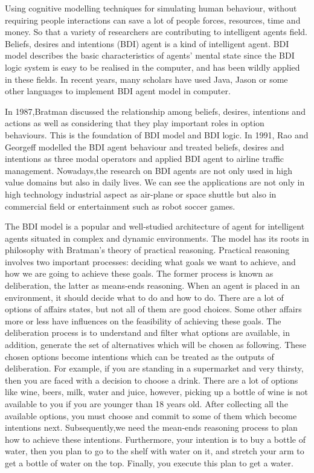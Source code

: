 Using cognitive modelling techniques for simulating human behaviour, without requiring people interactions can save a lot of people forces, resources, time and money. So that a variety of researchers are contributing to intelligent agents field. Beliefs, desires and intentions (BDI) agent is a kind of intelligent agent. BDI model describes the basic characteristics of agents' mental state since the BDI logic system is easy to be realised in the computer, and has been wildly applied in these fields. In recent years, many scholars have used Java, Jason or some other languages to implement BDI agent model in computer.

In 1987,Bratman\cite{MICHAEL_PlansResource_1988} discussed the relationship among beliefs, desires, intentions and actions as well as considering that they play important roles in option behaviours. This is the foundation of BDI model and BDI logic. In 1991, Rao and Georgeff\cite{Michael_BDIAgency_1999} modelled the BDI agent behaviour and treated beliefs, desires and intentions as three modal operators and applied BDI agent to airline traffic management. Nowadays,the research on BDI agents are not only used in high value domains but also in daily lives. We can see the applications are not only in high technology industrial aspect as air-plane or space shuttle but also in commercial field or entertainment such as robot soccer games.

The BDI model is a popular and well-studied architecture of agent for intelligent agents situated in complex and dynamic environments. The model has its roots in philosophy with Bratman’s theory of practical reasoning\cite{Sebastian_Hierarchical_2006}. Practical reasoning involves two important processes: deciding what goals we want to achieve, and how we are going to achieve these goals. The former process is known as deliberation, the latter as means-ends reasoning\cite{Gerhard_MultiSystem_1999}. When an agent is placed in an environment, it should decide what to do and how to do. There are a lot of options of affairs states, but not all of them are good choices. Some other affairs more or less have influences on the feasibility of achieving these goals. The deliberation process is to understand and filter what options are available, in addition, generate the set of alternatives which will be chosen as following. These chosen options become intentions which can be treated as the outputs of deliberation. For example, if you are standing in a supermarket and very thirsty, then you are faced with a decision to choose a drink. There are a lot of options like wine, beers, milk, water and juice, however, picking up a bottle of wine is not available to you if you are younger than 18 years old. After collecting all the available options, you must choose and commit to some of them which become intentions next. Subsequently,we need the mean-ends reasoning process to plan how to achieve these intentions. Furthermore, your intention is to buy a bottle of water, then you plan to go to the shelf with water on it, and stretch your arm to get a bottle of water on the top. Finally, you execute this plan to get a water.

